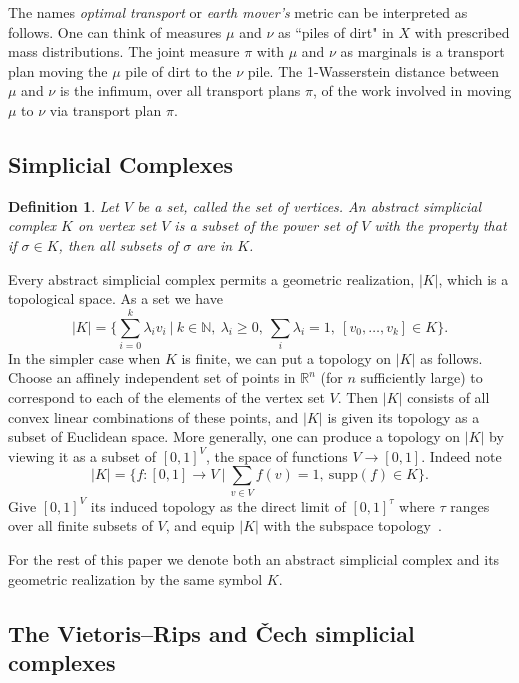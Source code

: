 \documentclass{amsart}
\theoremstyle{plain}
\newtheorem{definition}[lemma]{Definition}
\theoremstyle{definition}
\theoremstyle{myremark}
\newcommand{\N}{\mathbb{N}}
\newcommand{\R}{\mathbb{R}}
\newcommand{\supp}{\mathrm{supp}}
\begin{document}
The names \emph{optimal transport} or \emph{earth mover's} metric can be interpreted as follows. One can think of measures $\mu$ and $\nu$ as ``piles of dirt" in $X$ with prescribed mass distributions. The joint measure $\pi$ with $\mu$ and $\nu$ as marginals is a transport plan moving the $\mu$ pile of dirt to the $\nu$ pile. The 1-Wasserstein distance between $\mu$ and $\nu$ is the infimum, over all transport plans $\pi$, of the work involved in moving $\mu$ to $\nu$ via transport plan $\pi$.
 
\subsection{Simplicial Complexes}

\begin{definition}\label{def:SimplicialComplex}
Let $V$ be a set, called the set of vertices. An \emph{abstract simplicial complex} $K$ on vertex set $V$ is a subset of the power set of $V$ with the property that if $ \sigma \in K$, then all subsets of $\sigma$ are in $K$.
\end{definition}

Every abstract simplicial complex permits a geometric realization, $|K|$, which is a topological space.
As a set we have
\[ |K|=\Biggl\{\sum_{i=0}^k\lambda_i v_i~\Big|~k\in\N,\ \lambda_i\ge 0,\ \sum_i\lambda_i=1,\ [v_0,\ldots,v_k]\in K\Biggr\}. \]
In the simpler case when $K$ is finite, we can put a topology on $|K|$ as follows. Choose an affinely independent set of points in $\R^n$ (for $n$ sufficiently large) to correspond to each of the elements of the vertex set $V$.
Then $|K|$ consists of all convex linear combinations of these points, and $|K|$ is given its topology as a subset of Euclidean space.
More generally, one can produce a topology on $|K|$ by viewing it as a subset of $[0,1]^V$, the space of functions $V\to[0,1]$.
Indeed note
\[ |K|=\Biggl\{f\colon[0,1]\to V~\Bigg|~\sum_{v\in V}f(v)=1,\ \supp(f)\in K\Biggr\}. \]
Give $[0,1]^V$ its induced topology as the direct limit of $[0,1]^\tau$ where $\tau$ ranges over all finite subsets of $V$, and equip $|K|$ with the subspace topology~\cite{spanier1994algebraic}.

For the rest of this paper we denote both an abstract simplicial complex and its geometric realization by the same symbol $K$.

\subsection{The Vietoris--Rips and \v{C}ech simplicial complexes}
\end{document}

